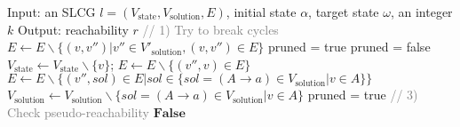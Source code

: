 \documentclass[runningheads]{llncs}
\begin{document}
\begin{algorithm}[ht]
\begin{algorithmic}
\State Input: an SLCG $l=(V_{\mathrm{state}},V_{\mathrm{solution}}, E)$, initial state $\alpha$, target state $\omega$, an integer $k$
\State Output: reachability $r$
\State \textcolor{gray}{// 1) Try to break cycles}\label{delete_cycle_begin}
                \State $E\gets E\backslash \{(v,v'')|v''\in V'_{\mathrm{solution}},(v,v'')\in E\}$
            \EndIf
        \EndFor
    \EndIf
\EndFor \label{delete_cycle_end}
\State{\textcolor{gray}{// 2) Remove useless nodes/edges}} \label{prune_begin}
\State pruned = true
    \State pruned = false
            \State $V_{\mathrm{state}} \gets V_{\mathrm{state}}\backslash \{v\}$; $E\gets E\backslash \{ (v'',v)\in E\}$
            \State $E\gets E\backslash \{ (v'',sol)\in E | sol \in \{sol = (A \rightarrow a) \in V_{\mathrm{solution}} | v \in A\}\}$
            \State $V_{\mathrm{solution}} \gets V_{\mathrm{solution}}\backslash \{sol = (A \rightarrow a) \in V_{\mathrm{solution}} | v \in A\}$
            \State pruned = true
        \EndIf
    \EndFor \label{prune_end}
\EndWhile
\State \textcolor{gray}{// 3) Check pseudo-reachability} \label{pseudo_reach_begin}
    \State \Return $\mathbf{False}$
\EndIf \label{pseudo_reach_end}


\end{algorithmic}
\end{algorithm}
\end{document}
